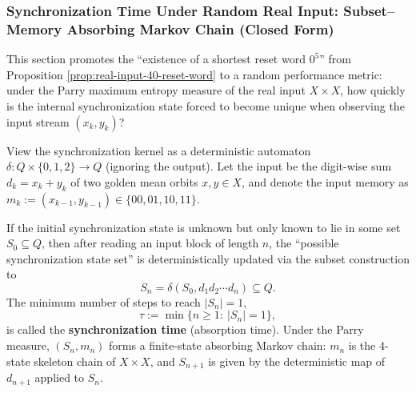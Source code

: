 \subsubsection{Synchronization Time Under Random Real Input: Subset--Memory Absorbing Markov Chain (Closed Form)}\label{app:real-input-40-sync-time}
This section promotes the ``existence of a shortest reset word $0^5$'' from Proposition \ref{prop:real-input-40-reset-word} to a random performance metric: under the Parry maximum entropy measure of the real input $X\times X$, how quickly is the internal synchronization state forced to become unique when observing the input stream $(x_k,y_k)$?

\begin{definition}\label{def:real-input-40-sync-time-absorbing}
View the synchronization kernel as a deterministic automaton \(\delta:Q\times\{0,1,2\}\to Q\) (ignoring the output). Let the input be the digit-wise sum \(d_k=x_k+y_k\) of two golden mean orbits \(x,y\in X\), and denote the input memory as \(m_k:=(x_{k-1},y_{k-1})\in\{00,01,10,11\}\).
\par
If the initial synchronization state is unknown but only known to lie in some set \(S_0\subseteq Q\), then after reading an input block of length \(n\), the ``possible synchronization state set'' is deterministically updated via the subset construction to
\[
S_n=\delta(S_0,d_1d_2\cdots d_n)\subseteq Q.
\]
The minimum number of steps to reach \(|S_n|=1\),
\[
\tau:=\min\{n\ge 1:\ |S_n|=1\},
\]
is called the \textbf{synchronization time} (absorption time).
Under the Parry measure, \((S_n,m_n)\) forms a finite-state absorbing Markov chain: \(m_n\) is the 4-state skeleton chain of \(X\times X\), and \(S_{n+1}\) is given by the deterministic map of \(d_{n+1}\) applied to \(S_n\).
\end{definition}

